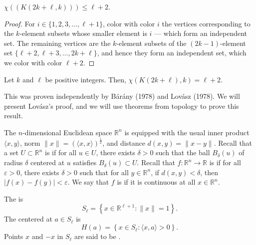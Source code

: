 \begin{lemma}
    \(\chi((K(2k+\ell, k))) \leq \ell+2\).
\end{lemma}

\begin{proof}
    For \(i \in \{1, 2, 3, \ldots, \ell+1\}\),
    color with color \(i\) the vertices corresponding to the \(k\)-element subsets whose smaller element is \(i\) --- which form an independent set.
    The remaining vertices are the \(k\)-element subsets of the \((2k-1)\)-element set \(\{\ell + 2, \ell + 3, \ldots, 2k + \ell\}\),
    and hence they form an independent set, which we color with color \(\ell + 2\).
\end{proof}

\begin{theorem} \label{thm:kneser-conjecture}
    Let \(k\) and \(\ell\) be positive integers.
    Then, \(\chi(K(2k+\ell), k) = \ell + 2\).
\end{theorem}

This was proven independently by Bárány (1978) and Lovász (1978).
We will present Lovász's proof, and we will use theorems from topology to prove this result.

The \(n\)-dimensional Euclidean space \(\mathbb{R}^n\)
is equipped with the usual inner product \(\langle x, y \rangle\),
norm \(\|x\| = \left( \langle x, x \rangle \right)^{\frac{1}{2}}\),
and distance \(d(x, y) = \|x - y\|\).
Recall that a set \(U \subset \mathbb{R}^n\) is 
if for all \(u \in U\), there exists \(\delta > 0\) such that
the ball \(B_\delta(u)\) of radius \(\delta\) centered at \(u\)
satisfies \(B_\delta(u) \subset U\).
Recall that \(f \colon \mathbb{R}^n \to \mathbb{R}\) is  if for all \(\varepsilon > 0\), there exists \(\delta > 0\) such that for all \(y \in \mathbb{R}^n\), if \(d(x, y) < \delta\), then \(\left| f(x) - f(y) \right| < \varepsilon\).
We say that \(f\) is  if it is continuous at all \(x \in \mathbb{R}^n\).

The  is 
\begin{equation}
    S_\ell = \left\{ x \in \mathbb{R}^{\ell+1} : \|x\| = 1 \right\}.
\end{equation}
The  centered at \(a \in S_\ell\) is
\begin{equation}
    H(a) = \left\{ x \in S_\ell : \langle x, a \rangle > 0 \right\}.
\end{equation}
Points \(x\) and \(-x\) in \(S_\ell\) are said to be .

